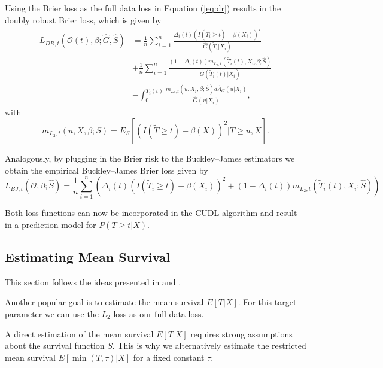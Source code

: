 \documentclass[12pt, a4paper]{scrartcl}
\theoremstyle{definition}
\theoremstyle{plain}
\numberwithin{equation}{section}
\numberwithin{figure}{section}
\numberwithin{table}{section}
\begin{document}
	Using the Brier loss as the full data loss in Equation (\ref{eq:dr}) results in the doubly robust Brier loss, which is given by
	\begin{equation*}
	\begin{split}
		L_{DR, t}(\mathcal{O}(t),\beta; \hat{G},\hat{S}) &=  \frac{1}{n} \sum_{i=1}^n \frac{\Delta_i(t)(I(\tilde{T}_i \geq t)-\beta(X_i))^2}{\hat{G}(\tilde{T}_i \vert X_i)}\\
		& + \frac{1}{n} \sum_{i=1}^n \frac{(1-\Delta_i(t))m_{L_2,t}(\tilde{T}_i(t),X_i,\beta; \hat{S})}{\hat{G}(\tilde{T}_i(t) \vert X_i)}\\
		& - \int_{0}^{\tilde{T}_i(t)} \frac{m_{L_2,t}(u,X_i,\beta; \hat{S})d\hat{\Lambda}_G(u\vert X_i)}{\hat{G}(u \vert X_i)},
	\end{split}
	\end{equation*}
	 with
	 \begin{equation*}
	 	m_{L_2,t}(u,X,\beta;S) = E_S[(I(\tilde{T}\geq t)-\beta(X))^2 \vert T \geq u, X].
	 \end{equation*}
	
	Analogously, by plugging in the Brier risk to the Buckley--James estimators we obtain the empirical Buckley--James Brier loss given by
	\begin{equation*}
		L_{BJ,t}(\mathcal{O},\beta; \hat{S}) = \frac{1}{n} \sum_{i=1}^n \left( \Delta_i(t)(I(\tilde{T}_i\geq t)-\beta(X_i))^2 + (1- \Delta_i(t))m_{L_2,t}(\tilde{T}_i(t), X_i; \hat{S})\right)
	\end{equation*}
	
	Both loss functions can now be incorporated in the CUDL algorithm and result in a prediction model for $P(T\geq t\vert X)$.

	\subsection{Estimating Mean Survival}
	
	This section follows the ideas presented in \citet*{basearticle} and \citet*{strawderman}.
	
	Another popular goal is to estimate the mean survival $E[T\vert X]$.
	For this target parameter we can use the $L_2$ loss as our full data loss.
	
	A direct estimation of the mean survival $E[T\vert X]$ requires strong assumptions about the survival function $S$.
	This is why we alternatively estimate the restricted mean survival $E[\min(T, \tau)\vert X]$ for a fixed constant $\tau$.
	
\end{document}
